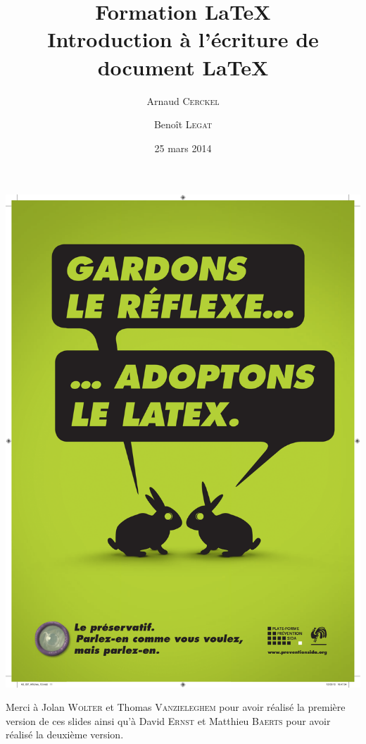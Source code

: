 \documentclass[10pt,svgnames,usenames,table]{beamer} %
\institute{Louvain-li-Nux}
\title{\textbf{Formation \LaTeX}\\Introduction à l'écriture de document \textrm{\LaTeX}}
\author{Arnaud \textsc{Cerckel} \and Benoît \textsc{Legat}}
\date{25 mars 2014}
\begin{document}
\begin{landscape}
\begin{frame}
	\vspace{-.5cm}
	\hspace*{.1mm}
	\includegraphics[page=1,height=\paperwidth]{latex_sida.pdf}
\end{frame}
\end{landscape}

\begin{frame}
\maketitle
Merci à Jolan \textsc{Wolter} et Thomas \textsc{Vanzieleghem} pour avoir réalisé la première version de ces slides
ainsi qu'à David \textsc{Ernst} et Matthieu \textsc{Baerts} pour avoir réalisé la deuxième version.
\end{frame}
\end{document}
